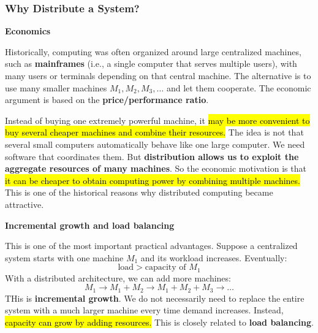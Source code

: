 \subsubsection{Why Distribute a System?}\label{subsubsec:introduction--why-distributed-systems--why-distribute-a-system}

\begin{flushleft}
    \textcolor{Green3}{ \textbf{Economics}}
\end{flushleft}
Historically, computing was often organized around large centralized machines, such as \textbf{mainframes} (i.e., a single computer that serves multiple users), with many users or terminals depending on that central machine. The alternative is to use many smaller machines $M_1, M_2, M_3, \dots$ and let them cooperate. The economic argument is based on the \textbf{price/performance ratio}.

\highspace
Instead of buying one extremely powerful machine, it \hl{may be more convenient to buy several cheaper machines and combine their resources.} The idea is not that several small computers automatically behave like one large computer. We need software that coordinates them. But \textbf{distribution allows us to exploit the aggregate resources of many machines}. So the economic motivation is that \hl{it can be cheaper to obtain computing power by combining multiple machines.} This is one of the historical reasons why distributed computing became attractive.

\highspace
\begin{flushleft}
    \textcolor{Green3}{ \textbf{Incremental growth and load balancing}}
\end{flushleft}
This is one of the most important practical advantages. Suppose a centralized system starts with one machine $M_1$ and its workload increases. Eventually:
\begin{equation*}
    \text{load} > \text{capacity of } M_1
\end{equation*}
With a distributed architecture, we can add more machines:
\begin{equation*}
    M_1 \to M_1 + M_2 \to M_1 + M_2 + M_3 \to \dots
\end{equation*}
THis is \textbf{incremental growth}. We do not necessarily need to replace the entire system with a much larger machine every time demand increases. Instead, \hl{capacity can grow by adding resources.} This is closely related to \textbf{load balancing}.

